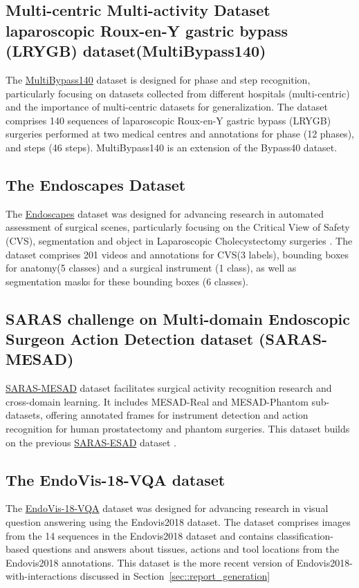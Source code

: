 \documentclass[times,twocolumn,final]{elsarticle}
\renewcommand{\cite}[1]{\citep{#1}}
\newcommand{\secref}[1]{Section~\ref{#1}}
\begin{document}
\subsection{Multi-centric Multi-activity Dataset laparoscopic Roux-en-Y gastric bypass (LRYGB) dataset(MultiBypass140)}
The \href{https://github.com/CAMMA-public/MultiBypass140}{MultiBypass140} dataset \citep{Lavanchy2024} is designed for phase and step recognition, particularly focusing on datasets collected from different hospitals (multi-centric) and the importance of multi-centric datasets for generalization. 
The dataset comprises 140 sequences of laparoscopic Roux-en-Y gastric bypass (LRYGB) surgeries performed at two medical centres and annotations for phase (12 phases), and steps (46 steps). MultiBypass140 is an extension of the Bypass40 \cite{Ramesh2021_phase_step_gastric_bypass} dataset.

\subsection{The Endoscapes Dataset}
The \href{https://github.com/CAMMA-public/Endoscapes}{Endoscapes} dataset was designed for advancing research in automated assessment of surgical scenes, particularly focusing on the Critical View of Safety (CVS), segmentation and object in Laparoscopic Cholecystectomy surgeries \citep{murali2023endoscapes}. 
The dataset comprises 201 videos and annotations for CVS(3 labels), bounding boxes for anatomy(5 classes) and a surgical instrument (1 class), as well as segmentation masks for these bounding boxes (6 classes).



\subsection{SARAS challenge on Multi-domain Endoscopic Surgeon Action Detection dataset (SARAS-MESAD)}
\href{https://saras-mesad.grand-challenge.org/Home/}{SARAS-MESAD} dataset \citep{saras_mesad} facilitates surgical activity recognition research and cross-domain learning. It includes MESAD-Real and MESAD-Phantom sub-datasets, offering annotated frames for instrument detection and action recognition for human prostatectomy and phantom surgeries. This dataset builds on the previous \href{https://saras-esad.grand-challenge.org/}{SARAS-ESAD} dataset \citep{bawa2021saras}.



\subsection{The EndoVis-18-VQA dataset} \label{sec:endovis_2018_vqa_dataset}
The \href{https://github.com/lalithjets/SurgicalGPT}{EndoVis-18-VQA} dataset  \citep{seenivasan2022surgical} was designed for advancing research in visual question answering using the Endovis2018 dataset. 
The dataset comprises images from the 14 sequences in the Endovis2018 dataset and contains classification-based questions and answers about tissues, actions and tool locations from the Endovis2018 annotations. This dataset is the more recent version of Endovis2018-with-interactions discussed in \secref{sec::report_generation}
\end{document}
